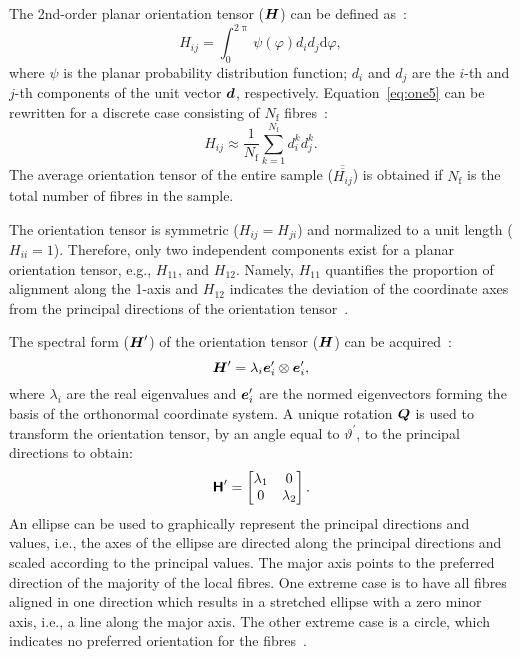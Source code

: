 The 2nd-order planar orientation tensor ($\tenb{H}$) can be defined as~\autocite{Advani.1987}:
\begin{equation}\label{eq:one5}
H_{ij}=\int_{0}^{2\uppi}\psi(\varphi)d_id_j\text{d}\varphi,
\end{equation}
where $\psi$ is the planar probability distribution function; $d_i$ and $d_j$ are the $i$-th and $j$-th components of the unit vector $\tena{d}$, respectively. Equation~\eqref{eq:one5} can be rewritten for a discrete case consisting of $N_\text{f}$ fibres~\autocite{Ranganathan.1990}:
\begin{equation}
H_{ij}\approx\frac{1}{N_\text{f}}\sum_{k=1}^{N_\text{f}}d_i^kd_j^k.
\end{equation}
The average orientation tensor of the entire sample ($\overline{\overline{H_{ij}}}$) is obtained if $N_\text{f}$ is the total number of fibres in the sample.

	The orientation tensor is symmetric ($H_{ij}=H_{ji}$) and normalized to a unit length ($H_{ii}=1$). Therefore, only two independent components exist for a planar orientation tensor, e.g., $H_{11}$, and $H_{12}$. Namely, $H_{11}$ quantifies the proportion of alignment along the 1-axis and $H_{12}$ indicates the deviation of the coordinate axes from the principal directions of the orientation tensor~\autocite{Javanbakht.2017d}.

	The spectral form ($\tenb{H}^\prime$) of the orientation tensor ($\tenb{H}$) can be acquired~\autocite{Bertram.2015}:
\begin{equation}
\tenb{H}^\prime=\lambda_i\tena{e}_i^\prime\otimes\tena{e}_i^\prime,
\end{equation}
where $\lambda_i$ are the real eigenvalues and $\tena{e}_i^\prime$ are the normed eigenvectors forming the basis of the orthonormal coordinate system. A unique rotation $\tenb{Q}$ is used to transform the orientation tensor, by an angle equal to $\vartheta^\prime$, to the principal directions to obtain:
\begin{equation}
\mat{H}^\prime=\left[\begin{matrix}
\lambda_1& 0 \\
0 & \lambda_2\\
\end{matrix}
 \right].
\end{equation}
	An ellipse can be used to graphically represent the principal directions and values, i.e., the axes of the ellipse are directed along the principal directions and scaled according to the principal values. The major axis points to the preferred direction of the majority of the local fibres. One extreme case is to have all fibres aligned in one direction which results in a stretched ellipse with a zero minor axis, i.e., a line along the major axis. The other extreme case is a circle, which indicates no preferred orientation for the fibres~\autocite{Advani.1990,Advani.1987}.

